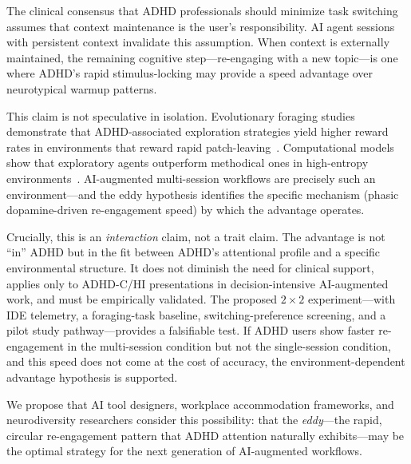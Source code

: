\documentclass[sigconf,nonacm]{acmart}
\begin{document}
The clinical consensus that ADHD professionals should minimize task switching assumes that context maintenance is the user's responsibility. AI agent sessions with persistent context invalidate this assumption. When context is externally maintained, the remaining cognitive step---re-engaging with a new topic---is one where ADHD's rapid stimulus-locking may provide a speed advantage over neurotypical warmup patterns.

This claim is not speculative in isolation. Evolutionary foraging studies demonstrate that ADHD-associated exploration strategies yield higher reward rates in environments that reward rapid patch-leaving~\cite{barack2024}. Computational models show that exploratory agents outperform methodical ones in high-entropy environments~\cite{meredith2025}. AI-augmented multi-session workflows are precisely such an environment---and the eddy hypothesis identifies the specific mechanism (phasic dopamine-driven re-engagement speed) by which the advantage operates.

Crucially, this is an \emph{interaction} claim, not a trait claim. The advantage is not ``in'' ADHD but in the fit between ADHD's attentional profile and a specific environmental structure. It does not diminish the need for clinical support, applies only to ADHD-C/HI presentations in decision-intensive AI-augmented work, and must be empirically validated. The proposed $2 \times 2$ experiment---with IDE telemetry, a foraging-task baseline, switching-preference screening, and a pilot study pathway---provides a falsifiable test. If ADHD users show faster re-engagement in the multi-session condition but not the single-session condition, and this speed does not come at the cost of accuracy, the environment-dependent advantage hypothesis is supported.

We propose that AI tool designers, workplace accommodation frameworks, and neurodiversity researchers consider this possibility: that the \emph{eddy}---the rapid, circular re-engagement pattern that ADHD attention naturally exhibits---may be the optimal strategy for the next generation of AI-augmented workflows.
\end{document}
